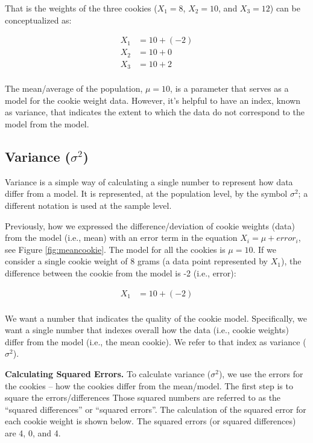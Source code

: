\documentclass[
]{krantz}
\begin{document}
That is the weights of the three cookies (\(X_1 = 8\), \(X_2 = 10\), and \(X_3 = 12\)) can be conceptualized as:

\[
\begin{aligned} 
X_1 &= 10 + (-2) \\
X_2 &= 10 + 0 \\
X_3 &= 10 + 2 \\
\end{aligned} 
\]

The mean/average of the population, \(\mu = 10\), is a parameter that serves as a model for the cookie weight data. However, it's helpful to have an index, known as variance, that indicates the extent to which the data do not correspond to the model from the model.

\hypertarget{variance-sigma2}{%
\subsection{\texorpdfstring{Variance (\(\sigma^2\))}{Variance (\textbackslash sigma\^{}2)}}\label{variance-sigma2}}

Variance is a simple way of calculating a single number to represent how data differ from a model. It is represented, at the population level, by the symbol \(\sigma^2\); a different notation is used at the sample level.

Previously, how we expressed the difference/deviation of cookie weights (data) from the model (i.e., mean) with an error term in the equation \(X_i = \mu +error_i\), see Figure \ref{fig:meancookie}. The model for all the cookies is \(\mu = 10\). If we consider a single cookie weight of 8 grams (a data point represented by \(X_1\)), the difference between the cookie from the model is -2 (i.e., error):

\[
\begin{aligned} 
X_1 &= 10 + (-2) \\
\end{aligned} 
\]

We want a number that indicates the quality of the cookie model. Specifically, we want a single number that indexes overall how the data (i.e., cookie weights) differ from the model (i.e., the mean cookie). We refer to that index as variance (\(\sigma^2\)).

\textbf{Calculating Squared Errors.} To calculate variance (\(\sigma^2\)), we use the errors for the cookies -- how the cookies differ from the mean/model. The first step is to square the errors/differences Those squared numbers are referred to as the ``squared differences'' or ``squared errors''. The calculation of the squared error for each cookie weight is shown below. The squared errors (or squared differences) are 4, 0, and 4.
\end{document}

